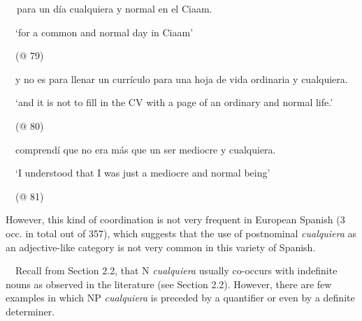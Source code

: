 \begin{styleStandard}
\textbf{\ \ }para un día cualquiera y normal en el Ciaam. 
\end{styleStandard}

\begin{styleStandard}
\ \ ‘for a common and normal day in Ciaam’
\end{styleStandard}

\begin{styleStandard}
\ \ (@ 79)
\end{styleStandard}

\begin{styleStandard}
\ \ y no es para llenar un currículo para una hoja de vida ordinaria y cualquiera.
\end{styleStandard}

\begin{styleStandard}
\ \ ‘and it is not to fill in the CV with a page of an ordinary and normal life.’
\end{styleStandard}

\begin{styleStandard}
\ \ (@ 80)
\end{styleStandard}

\begin{styleStandard}
\ \ comprendí que no era más que un ser mediocre y cualquiera. 
\end{styleStandard}

\begin{styleStandard}
\ \ ‘I understood that I was just a mediocre and normal being’
\end{styleStandard}

\begin{styleStandard}
\ \ (@ 81)
\end{styleStandard}

\begin{styleStandard}
However, this kind of coordination is not very frequent in European Spanish (3 occ. in total out of 357), which suggests that the use of postnominal \textit{cualquiera} as an adjective-like category is not very common in this variety of Spanish.
\end{styleStandard}

\begin{styleStandard}
\ \ Recall from Section 2.2, that N \textit{cualquiera} usually co-occurs with indefinite nouns as observed in the literature (see Section 2.2). However, there are few examples in which NP \textit{cualquiera} is preceded by a quantifier or even by a definite determiner.
\end{styleStandard}

